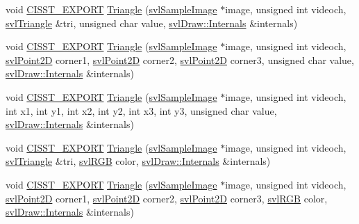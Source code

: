 \begin{DoxyCompactItemize}
\item 
void \hyperlink{cmn_export_macros_8h_a99393e0c3ac434b2605235bbe20684f8}{C\+I\+S\+S\+T\+\_\+\+E\+X\+P\+O\+R\+T} \hyperlink{namespacesvl_draw_a43971f54fdbb76a7713066278014c693}{Triangle} (\hyperlink{classsvl_sample_image}{svl\+Sample\+Image} $\ast$image, unsigned int videoch, \hyperlink{structsvl_triangle}{svl\+Triangle} \&tri, unsigned char value, \hyperlink{classsvl_draw_1_1_internals}{svl\+Draw\+::\+Internals} \&internals)
\item 
void \hyperlink{cmn_export_macros_8h_a99393e0c3ac434b2605235bbe20684f8}{C\+I\+S\+S\+T\+\_\+\+E\+X\+P\+O\+R\+T} \hyperlink{namespacesvl_draw_ad44d9f068bd3ff03dc1d4a651716b3b6}{Triangle} (\hyperlink{classsvl_sample_image}{svl\+Sample\+Image} $\ast$image, unsigned int videoch, \hyperlink{structsvl_point2_d}{svl\+Point2\+D} corner1, \hyperlink{structsvl_point2_d}{svl\+Point2\+D} corner2, \hyperlink{structsvl_point2_d}{svl\+Point2\+D} corner3, unsigned char value, \hyperlink{classsvl_draw_1_1_internals}{svl\+Draw\+::\+Internals} \&internals)
\item 
void \hyperlink{cmn_export_macros_8h_a99393e0c3ac434b2605235bbe20684f8}{C\+I\+S\+S\+T\+\_\+\+E\+X\+P\+O\+R\+T} \hyperlink{namespacesvl_draw_a05a4ceefdaa5c2d4bfce3aa9ff4a7cbe}{Triangle} (\hyperlink{classsvl_sample_image}{svl\+Sample\+Image} $\ast$image, unsigned int videoch, int x1, int y1, int x2, int y2, int x3, int y3, unsigned char value, \hyperlink{classsvl_draw_1_1_internals}{svl\+Draw\+::\+Internals} \&internals)
\item 
void \hyperlink{cmn_export_macros_8h_a99393e0c3ac434b2605235bbe20684f8}{C\+I\+S\+S\+T\+\_\+\+E\+X\+P\+O\+R\+T} \hyperlink{namespacesvl_draw_ae3ddae7f8b642aacd441eb5db4b783ea}{Triangle} (\hyperlink{classsvl_sample_image}{svl\+Sample\+Image} $\ast$image, unsigned int videoch, \hyperlink{structsvl_triangle}{svl\+Triangle} \&tri, \hyperlink{structsvl_r_g_b}{svl\+R\+G\+B} color, \hyperlink{classsvl_draw_1_1_internals}{svl\+Draw\+::\+Internals} \&internals)
\item 
void \hyperlink{cmn_export_macros_8h_a99393e0c3ac434b2605235bbe20684f8}{C\+I\+S\+S\+T\+\_\+\+E\+X\+P\+O\+R\+T} \hyperlink{namespacesvl_draw_a859c6870ca3bc4d46ed05133ebd3f8ae}{Triangle} (\hyperlink{classsvl_sample_image}{svl\+Sample\+Image} $\ast$image, unsigned int videoch, \hyperlink{structsvl_point2_d}{svl\+Point2\+D} corner1, \hyperlink{structsvl_point2_d}{svl\+Point2\+D} corner2, \hyperlink{structsvl_point2_d}{svl\+Point2\+D} corner3, \hyperlink{structsvl_r_g_b}{svl\+R\+G\+B} color, \hyperlink{classsvl_draw_1_1_internals}{svl\+Draw\+::\+Internals} \&internals)

\end{DoxyCompactItemize}
